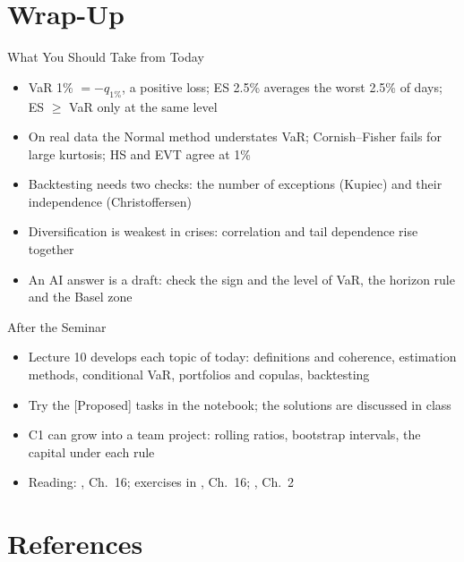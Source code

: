\section{Wrap-Up}

\begin{frame}{What You Should Take from Today}
\itemsize{\small}
\begin{itemize}
    \item VaR 1\% $= -q_{1\%}$, a positive loss; ES 2.5\% averages the worst 2.5\% of days; ES $\ge$ VaR only at the same level
    \item On real data the Normal method understates VaR; Cornish--Fisher fails for large kurtosis; HS and EVT agree at 1\%
    \item Backtesting needs two checks: the number of exceptions (Kupiec) and their independence (Christoffersen)
    \item Diversification is weakest in crises: correlation and tail dependence rise together
    \item An AI answer is a draft: check the sign and the level of VaR, the horizon rule and the Basel zone
\end{itemize}
\end{frame}

\begin{frame}{After the Seminar}
\itemsize{\small}
\begin{itemize}
    \item Lecture 10 develops each topic of today: definitions and coherence, estimation methods, conditional VaR, portfolios and copulas, backtesting
    \item Try the [Proposed] tasks in the notebook; the solutions are discussed in class
    \item C1 can grow into a team project: rolling ratios, bootstrap intervals, the capital under each rule
    \item Reading: , Ch.~16; exercises in , Ch.~16; , Ch.~2
\end{itemize}
\end{frame}


\section{References}

